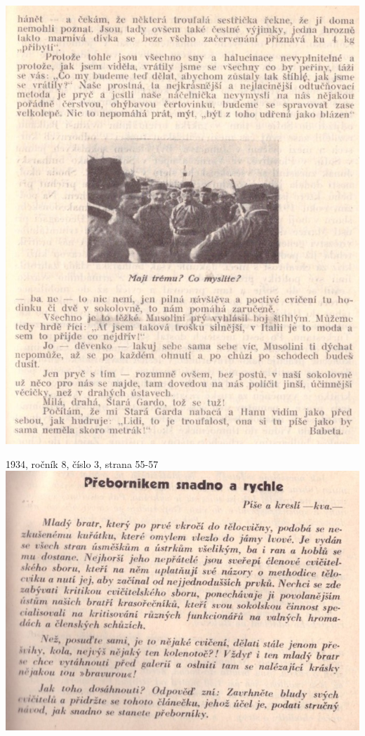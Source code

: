 \documentclass[11pt]{article}
\begin{document}
\includegraphics[width=\imagewidth]{original/1932/Skener_20250320 (12).jpg}





1934, ročník 8, číslo 3, strana 55-57 \\
\includegraphics[width=\imagewidth]{original/1934/Skener_20250325 (8).jpg}
\end{document}
